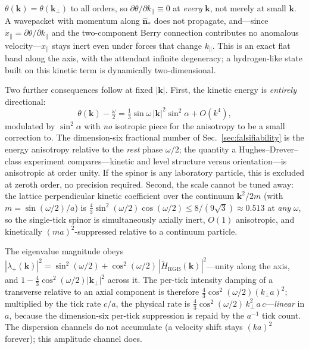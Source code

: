 \begin{proposition}
\label{prop:flat_band}
$\theta(\mathbf{k}) = \theta(\mathbf{k}_\perp)$ to all orders, so
$\partial\theta/\partial k_\parallel \equiv 0$ at \emph{every} $\mathbf{k}$, not
merely at small $\mathbf{k}$. A wavepacket with momentum along $\hat{\mathbf{n}}_*$
does not propagate, and---since $\dot{x}_\parallel = \partial\theta/\partial
k_\parallel$ and the two-component Berry connection contributes no anomalous
velocity---$x_\parallel$ stays inert even under forces that change $k_\parallel$.
This is an exact flat band along the axis, with the attendant infinite degeneracy;
a hydrogen-like state built on this kinetic term is dynamically two-dimensional.
\end{proposition}

Two further consequences follow at fixed $|\mathbf{k}|$. First, the kinetic energy
is \emph{entirely} directional:
\begin{equation}
    \theta(\mathbf{k}) - \tfrac{\omega}{2}
      = \tfrac13\sin\omega\,|\mathbf{k}|^2\sin^2\!\alpha + O(k^4),
    \label{eq:kinetic_energy}
\end{equation}
modulated by $\sin^2\alpha$ with \emph{no} isotropic piece for the anisotropy to be
a small correction to. The dimension-six fractional number of
Sec.~\ref{sec:falsifiability} is the energy anisotropy relative to the \emph{rest}
phase $\omega/2$; the quantity a Hughes--Drever--class experiment compares---kinetic
and level structure versus orientation---is anisotropic at order unity. If the
spinor is any laboratory particle, this is excluded at zeroth order, no precision
required. Second, the scale cannot be tuned away: the lattice perpendicular kinetic
coefficient over the continuum $\mathbf{k}^2/2m$ (with $m=\sin(\omega/2)/a$) is
$\tfrac43\sin^2(\omega/2)\cos(\omega/2)\le 8/(9\sqrt3)\approx0.513$ at \emph{any}
$\omega$, so the single-tick spinor is simultaneously axially inert, $O(1)$
anisotropic, and kinetically $(ma)^2$-suppressed relative to a continuum particle.

\begin{proposition}[Linearly accumulating $\omega=0$ filtering]
\label{prop:filtering}
The eigenvalue magnitude obeys $|\lambda_+(\mathbf{k})|^2 = \sin^2(\omega/2) +
\cos^2(\omega/2)\,|\tilde H_\text{RGB}(\mathbf{k})|^2$---unity along the axis, and
$1-\tfrac43\cos^2(\omega/2)|\mathbf{k}_\perp|^2$ across it. The per-tick intensity
damping of a transverse relative to an axial component is therefore
$\tfrac43\cos^2(\omega/2)(k_\perp a)^2$; multiplied by the tick rate $c/a$, the
physical rate is $\tfrac43\cos^2(\omega/2)\,k_\perp^2\,a\,c$---\emph{linear} in $a$,
because the dimension-six per-tick suppression is repaid by the $a^{-1}$ tick count.
The dispersion channels do not accumulate (a velocity shift stays $(ka)^2$ forever);
this amplitude channel does.
\end{proposition}

